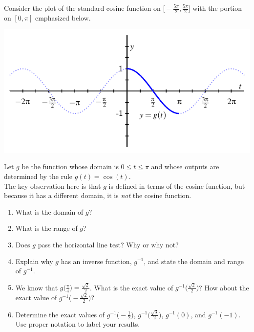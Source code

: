\documentclass{ximera}
\begin{document}
Consider the plot of the standard cosine function on $\Big[-\frac{5\pi}{2},\frac{5\pi}{2}\Big]$ with the portion on $[0,\pi]$ emphasized below.%

\begin{image}
\includegraphics{inverse-trig-PA-cosine.pdf}
\end{image}

\begin{exploration}
Let $g$ be the function whose domain is $0 \leq t \leq \pi$ and whose outputs are determined by the rule $g(t) = \cos(t)$.  \\
The key observation here is that $g$ is defined in terms of the cosine function, but because it has a different domain, it is \emph{not} the cosine function.%
\par

\begin{enumerate}[label=\alph*.]
\item
What is the domain of $g$?%
\item
What is the range of $g$?%
\item
Does $g$ pass the horizontal line test? Why or why not?%
\item
Explain why $g$ has an inverse function, $g^{-1}$, and state the domain and range of $g^{-1}$.%
\item
We know that $g\Big(\frac{\pi}{4}\Big) = \frac{\sqrt{2}}{2}$. What is the exact value of $g^{-1}\bigg(\frac{\sqrt{2}}{2}\bigg)$? How about the exact value of $g^{-1}\bigg(-\frac{\sqrt{2}}{2}\bigg)$?%
\item
Determine the exact values of $g^{-1}\Big(-\frac{1}{2}\Big)$, $g^{-1}\bigg(\frac{\sqrt{3}}{2}\bigg)$, $g^{-1}(0)$, and $g^{-1}(-1)$. Use proper notation to label your results.%
\end{enumerate}
\end{exploration}

\end{document}
